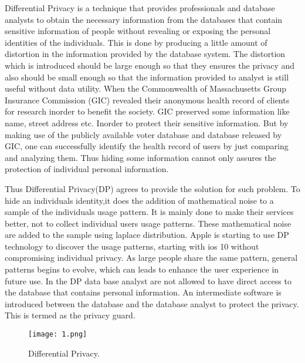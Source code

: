 \documentclass[10pt,a4paper,journal]{IEEEtran}
\begin{document}
\hspace{2em} Differential Privacy\cite{1} is a technique that provides professionals and database analysts to obtain the necessary information from the databases that contain sensitive information of people without revealing or exposing the personal identities of the individuals. This is done by producing a little amount of distortion in the information provided by the database system. The distortion which is introduced should be large enough so that they ensures the privacy and also  should be small enough so that the information provided to analyst is still useful without data utility. When the Commonwealth of Massachusetts Group Insurance Commission (GIC) revealed their anonymous health record of clients for research inorder to benefit the society. GIC preserved some information like name, street address etc. Inorder to protect their sensitive information. But by making use of the publicly available voter database and database released by GIC, one can  successfully identify the health record of users by just comparing and analyzing them. Thus hiding some information cannot only  assures the protection of individual personal information. 

\hspace{2em} Thus Differential Privacy(DP) agrees to provide the solution for such problem. To hide an individuals identity,it does the addition of mathematical noise to a sample of the individuals usage pattern. It is mainly done to make their services better, not to collect individual users usage patterns. These mathematical noise are added to the sample using laplace distribution. Apple is starting to use DP technology to discover the usage patterns, starting with ios 10 without compromising individual privacy. As large people share the same pattern, general patterns begins to evolve, which can leads to enhance the user experience in future use. In the DP data base analyst are not allowed to have direct access to the database that contains personal information. An intermediate software is introduced between the database and the database analyst to protect the privacy. This is termed as the privacy guard.\\
\begin{figure}[htbp]
\begin{center}
\texttt{[image: 1.png]}
\caption{Differential Privacy\cite{1}.}
\label{Figure 1:}
\end{center}
\end{figure}
\end{document}
